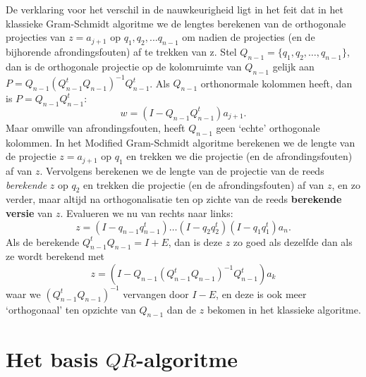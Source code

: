 \documentclass{article}
\begin{document}
De verklaring voor het verschil in de nauwkeurigheid ligt in het feit dat in het klassieke Gram-Schmidt algoritme we de lengtes berekenen van de orthogonale projecties van $z=a_{j+1}$ op $q_1,q_2,...q_{n-1}$ om nadien de projecties (en de bijhorende afrondingsfouten) af te trekken van z. Stel $Q_{n-1} = \{q_1,q_2,\dots,q_{n-1}\}$, dan is de orthogonale projectie op de kolomruimte van $Q_{n-1}$ gelijk aan $P=Q_{n-1}(Q^t_{n-1}Q_{n-1})^{-1}Q^t_{n-1}$. Als $Q_{n-1}$ orthonormale kolommen heeft, dan is $P=Q_{n-1}Q^t_{n-1}:$ 
$$w = (I-Q_{n-1}Q^t_{n-1})a_{j+1}.$$
Maar omwille van afrondingsfouten, heeft $Q_{n-1}$ geen `echte' orthogonale kolommen. In het Modified Gram-Schmidt algoritme berekenen we de lengte van de projectie $z=a_{j+1}$ op $q_1$ en trekken we die projectie (en de afrondingsfouten) af van $z$. Vervolgens berekenen we de lengte van de projectie van de reeds \textit{berekende} $z$ op $q_2$ en trekken die projectie (en de afrondingsfouten) af van $z$, en zo verder, maar altijd na orthogonalisatie ten op zichte van de reeds \textbf{berekende versie} van $z$. Evalueren we nu van rechts naar links:
$$z = (I-q_{n-1}q_{n-1}^t) \dots (I-q_2q_2^t)(I-q_1q_1^t)a_n.$$
Als de berekende $Q^t_{n-1}Q_{n-1} = I + E$, dan is deze $z$ zo goed als dezelfde dan als ze wordt berekend met $$z=(I-Q_{n-1}(Q^t_{n-1}Q_{n-1})^{-1}Q^t_{n-1})a_k$$ waar we $(Q^t_{n-1}Q_{n-1})^{-1}$ vervangen door $I-E$, en deze is ook meer `orthogonaal' ten opzichte van $Q_{n-1}$ dan de $z$ bekomen in het klassieke algoritme.




\section{Het basis $QR$-algoritme}
\end{document}
